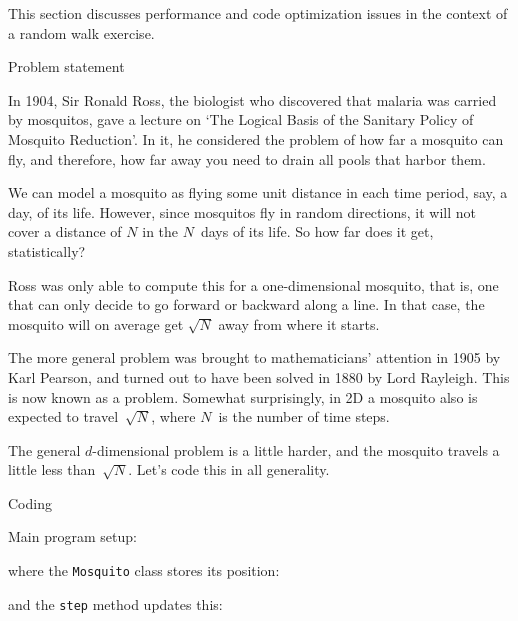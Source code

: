 
This section discusses performance and code optimization issues
in the context of a random walk exercise.

 {Problem statement}

In 1904, Sir Ronald Ross, the biologist who discovered that malaria was carried
by mosquitos, gave a lecture on
`The Logical Basis of the Sanitary Policy of Mosquito Reduction'.
In it, he considered the problem of how far a mosquito can fly,
and therefore, how far away you need to drain all pools that harbor them.

We can model a mosquito as flying some unit distance in each time period,
say, a day, of its life.
However, since mosquitos fly in random directions, it will
not cover a distance of $N$ in the $N$~days of its life.
So how far does it get, statistically?

Ross was only able to compute this for a one-dimensional mosquito,
that is, one that can only decide to go forward or backward along a line.
In that case, the mosquito will on average get $\sqrt N$ away from where it starts.

The more general problem was brought to mathematicians' attention in 1905
by Karl Pearson, and turned out to have been solved in 1880 by Lord Rayleigh.
This is now known as a  problem.
Somewhat surprisingly, in 2D a mosquito also is expected to travel~$\sqrt N$,
where $N$~is the number of time steps.

The general $d$-dimensional problem is a little harder, and the mosquito
travels a little less than~$\sqrt N$.
Let's code this in all generality.

 {Coding}

Main program setup:


where the \lstinline{Mosquito} class stores its position:


and the \lstinline{step} method updates this:


